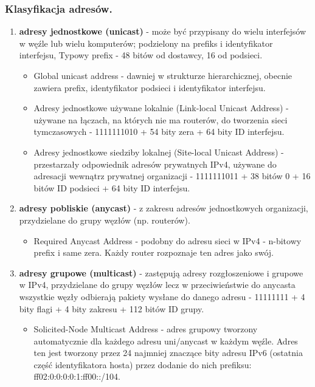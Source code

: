 \documentclass[12pt]{article}
\begin{document}
    \subsubsection{Klasyfikacja adresów.}
    \begin{enumerate}
        \item \textbf{adresy jednostkowe (unicast)} - może być przypisany do wielu interfejsów w węźle lub wielu komputerów;
        podzielony na prefiks i identyfikator interfejsu, Typowy prefix - 48 bitów od dostawcy, 16 od podsieci.
        \begin{itemize}
            \item Global unicast address - dawniej w strukturze hierarchicznej, obecnie zawiera prefix,
            identyfikator podsieci i identyfikator interfejsu.
            \item Adresy jednostkowe używane lokalnie (Link-local Unicast Address) - używane na łączach, na których nie
            ma routerów, do tworzenia sieci tymczasowych - 1111111010 + 54 bity zera + 64 bity ID interfejsu.
            \item Adresy jednostkowe siedziby lokalnej (Site-local Unicast Address) - przestarzały odpowiednik adresów
            prywatnych IPv4, używane do adresacji wewnątrz prywatnej organizacji - 1111111011 + 38 bitów 0 + 16 bitów
            ID podsieci + 64 bity ID interfejsu.
        \end{itemize}
        \item \textbf{adresy pobliskie (anycast)} - z zakresu adresów jednostkowych organizacji, przydzielane do grupy
        węzłów (np. routerów).
        \begin{itemize}
            \item Required Anycast Address - podobny do adresu sieci w IPv4 - n-bitowy prefix i same zera. Każdy router
            rozpoznaje ten adres jako swój.
        \end{itemize}
        \item \textbf{adresy grupowe (multicast)} - zastępują adresy rozgłoszeniowe i grupowe w IPv4, przydzielane do
        grupy węzłów lecz w przeciwieństwie do anycasta wszystkie węzły odbierają pakiety wysłane do danego adresu
        - 11111111 + 4 bity flagi + 4 bity zakresu + 112 bitów ID grupy.
        \begin{itemize}
            \item Solicited-Node Multicast Address - adres grupowy tworzony automatycznie dla każdego adresu uni/anycast
            w każdym węźle. Adres ten jest tworzony
            przez 24 najmniej znaczące bity adresu IPv6 (ostatnia część identyfikatora hosta) przez
            dodanie do nich prefiksu: ff02:0:0:0:0:1:ff00::/104.
        \end{itemize}
    \end{enumerate}
\end{document}
